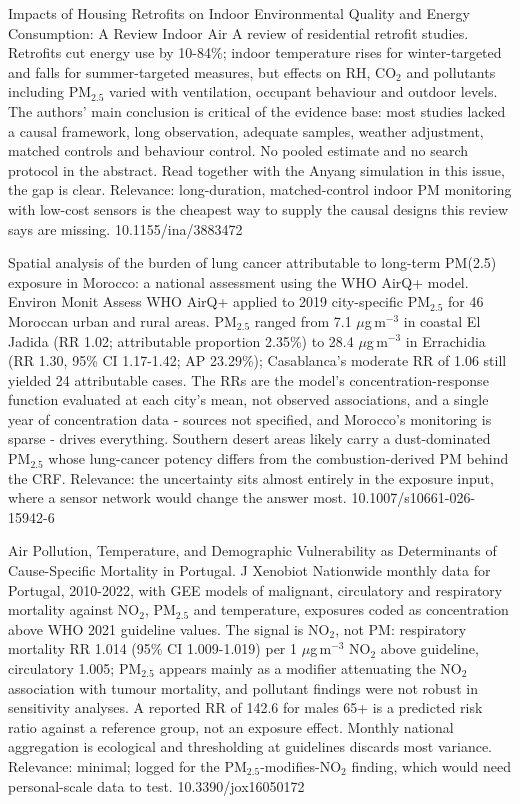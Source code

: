 \documentclass[10pt]{article}
\begin{document}
{Impacts of Housing Retrofits on Indoor Environmental Quality and Energy Consumption: A Review}
{Indoor Air}
{A review of residential retrofit studies. Retrofits cut energy use by 10-84\%; indoor temperature rises for winter-targeted and falls for summer-targeted measures, but effects on RH, CO$_2$ and pollutants including PM$_{2.5}$ varied with ventilation, occupant behaviour and outdoor levels. The authors' main conclusion is critical of the evidence base: most studies lacked a causal framework, long observation, adequate samples, weather adjustment, matched controls and behaviour control. No pooled estimate and no search protocol in the abstract. Read together with the Anyang simulation in this issue, the gap is clear. Relevance: long-duration, matched-control indoor PM monitoring with low-cost sensors is the cheapest way to supply the causal designs this review says are missing.}
{10.1155/ina/3883472}


{Spatial analysis of the burden of lung cancer attributable to long-term PM(2.5) exposure in Morocco: a national assessment using the WHO AirQ+ model.}
{Environ Monit Assess}
{WHO AirQ+ applied to 2019 city-specific PM$_{2.5}$ for 46 Moroccan urban and rural areas. PM$_{2.5}$ ranged from 7.1 $\mu$g\,m$^{-3}$ in coastal El Jadida (RR 1.02; attributable proportion 2.35\%) to 28.4 $\mu$g\,m$^{-3}$ in Errachidia (RR 1.30, 95\% CI 1.17-1.42; AP 23.29\%); Casablanca's moderate RR of 1.06 still yielded 24 attributable cases. The RRs are the model's concentration-response function evaluated at each city's mean, not observed associations, and a single year of concentration data - sources not specified, and Morocco's monitoring is sparse - drives everything. Southern desert areas likely carry a dust-dominated PM$_{2.5}$ whose lung-cancer potency differs from the combustion-derived PM behind the CRF. Relevance: the uncertainty sits almost entirely in the exposure input, where a sensor network would change the answer most.}
{10.1007/s10661-026-15942-6}

{Air Pollution, Temperature, and Demographic Vulnerability as Determinants of Cause-Specific Mortality in Portugal.}
{J Xenobiot}
{Nationwide monthly data for Portugal, 2010-2022, with GEE models of malignant, circulatory and respiratory mortality against NO$_2$, PM$_{2.5}$ and temperature, exposures coded as concentration above WHO 2021 guideline values. The signal is NO$_2$, not PM: respiratory mortality RR 1.014 (95\% CI 1.009-1.019) per 1 $\mu$g\,m$^{-3}$ NO$_2$ above guideline, circulatory 1.005; PM$_{2.5}$ appears mainly as a modifier attenuating the NO$_2$ association with tumour mortality, and pollutant findings were not robust in sensitivity analyses. A reported RR of 142.6 for males 65+ is a predicted risk ratio against a reference group, not an exposure effect. Monthly national aggregation is ecological and thresholding at guidelines discards most variance. Relevance: minimal; logged for the PM$_{2.5}$-modifies-NO$_2$ finding, which would need personal-scale data to test.}
{10.3390/jox16050172}
\end{document}
